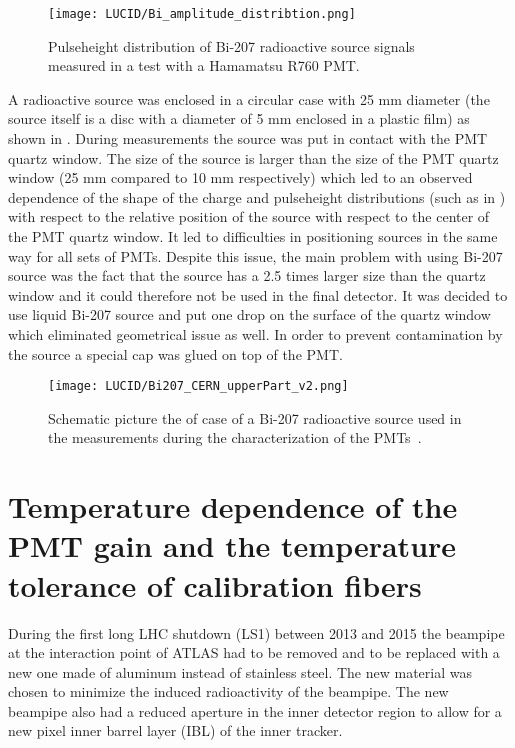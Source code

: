 \begin{figure}
\centering
\texttt{[image: LUCID/Bi\_amplitude\_distribtion.png]}
\caption{Pulseheight distribution of Bi-207 radioactive source signals measured in a test with a Hamamatsu R760 PMT.}
\label{fig:pulseheight_Bi207}
\end{figure}

A radioactive source was enclosed in a circular case with 25 mm diameter 
(the source itself is a disc with a diameter of 5 mm enclosed in a plastic film) as shown in .
During measurements the source was put in contact with the PMT quartz window.
The size of the source is larger than the size of the PMT quartz window (25 mm compared to 10 mm respectively) which led to an observed dependence of the shape of the charge and pulseheight distributions (such as in ) with respect to the relative position of the source 
with respect to the center of the PMT quartz window.
It led to difficulties in positioning sources in the same way for all sets of PMTs.
Despite this issue, the main problem with using Bi-207 source was the fact that the source has a 2.5 times larger size than the quartz window
and it could therefore not be used in the final detector.
It was decided to use liquid Bi-207 source and put one drop on the surface of the quartz window which eliminated geometrical issue as well.
In order to prevent contamination by the source a special cap was glued on top of the PMT.
 
\begin{figure}
\centering
\texttt{[image: LUCID/Bi207\_CERN\_upperPart\_v2.png]}
\caption{Schematic picture the of case of a Bi-207 radioactive source used in the measurements during the characterization of the PMTs~\cite{Alberghi:2016tad}.}
\label{fig:Bi207_case}
\end{figure}

\section{Temperature dependence of the PMT gain and the temperature tolerance of calibration fibers}
\label{sec:tempMeas}

During the first long LHC shutdown (LS1) between 2013 and 2015 the beampipe at the interaction point of ATLAS
had to be removed and to be replaced with a new one made of aluminum instead of stainless steel.
The new material was chosen to minimize the induced radioactivity of the beampipe.
The new beampipe also had a reduced aperture in the inner detector region to allow for a new pixel inner barrel layer (IBL) of the inner tracker.

